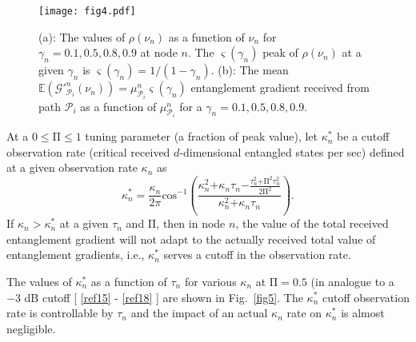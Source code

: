 \documentclass[11pt]{article}%
\newcommand{\fref}[1]{Fig.~\ref{#1}}
\newcommand*{\cref}[1]{%
  \begingroup
    \hypersetup{
      linkcolor=linkequation,
      linkbordercolor=linkequation,
    }%
    \ref{#1}%
  \endgroup
}
\begin{document}
\begin{figure*}[h!]
\vspace{-0.6cm}
 \begin{center}
 	 \texttt{[image: fig4.pdf]}

\caption{(a): The values of $\rho \left({\nu }_n\right)$ as a function of ${\nu }_n$ for ${\gamma }_n\mathrm{=0.1,0.5,0.8,0.9}$ at node $n$. The $\varsigma \left({\gamma }_n\right)$ peak of $\rho \left({\nu }_n\right)$ at a given ${\gamma }_n$ is $\varsigma \left({\gamma }_n\right)\mathrm{=}{\mathrm{1}}/{\left(\mathrm{1-}{\gamma }_n\right)}$. (b): The mean $\mathbb{E}\left({\mathcal{G}}'^n_{{\mathcal{P}}_i}\left({\nu }_n\right)\right)\mathrm{=}{\mu }^n_{{\mathcal{P}}_i}\varsigma \left({\gamma }_n\right)$ entanglement gradient received from path ${\mathcal{P}}_i$ as a function of ${\mu }^n_{{\mathcal{P}}_i}$ for a ${\gamma }_n\mathrm{=0.1,0.5,0.8,0.9}$.}
\label{fig4}
\end{center}
\end{figure*}

At a $\mathrm{0}\mathrm{\le }\mathrm{\Pi }\mathrm{\le }\mathrm{1}$ tuning parameter (a fraction of peak value), let ${\kappa }^{\mathrm{*}}_n$ be a cutoff observation rate (critical received $d$-dimensional entangled states per sec) defined at a given observation rate ${\kappa }_n$ as
\begin{equation} \label{54)} 
{\kappa }^{\mathrm{*}}_n\mathrm{=}\frac{{\kappa }_n}{\mathrm{2}\pi }\mathrm{co}{\mathrm{s}}^{\mathrm{-}\mathrm{1}}\left(\frac{{\kappa }^{\mathrm{2}}_n\mathrm{+}{\kappa }_n{\tau }_n\mathrm{-}\frac{{\tau }^{\mathrm{2}}_n\mathrm{+}{\mathrm{\Pi }}^{\mathrm{2}}{\tau }^{\mathrm{2}}_n}{\mathrm{2}{\mathrm{\Pi }}^{\mathrm{2}}}}{{\kappa }^{\mathrm{2}}_n\mathrm{+}{\kappa }_n{\tau }_n}\right). 
\end{equation} 
If ${\kappa }_n\mathrm{>}{\kappa }^{\mathrm{*}}_n$ at a given ${\tau }_n$ and $\mathrm{\Pi }$, then in node $n$, the value of the total received entanglement gradient will not adapt to the actually received total value of entanglement gradients, i.e., ${\kappa }^{\mathrm{*}}_n$ serves a cutoff in the observation rate.  

 The values of ${\kappa }^{\mathrm{*}}_n$ as a function of ${\tau }_n$ for various ${\kappa }_n$ at $\mathrm{\Pi }\mathrm{=0.5}$ (in analogue to a $\mathrm{-}\mathrm{3}$ dB cutoff [\cref{ref15}-\cref{ref18}] are shown in \fref{fig5}. The ${\kappa }^{\mathrm{*}}_n$ cutoff observation rate is controllable by ${\tau }_n$ and the impact of an actual ${\kappa }_n$ rate on ${\kappa }^{\mathrm{*}}_n$ is almost negligible.\\
\end{document}
